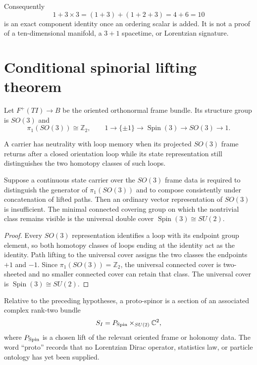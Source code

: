 \documentclass[11pt]{article}
\begin{document}
Consequently
\[
 1+3\times3=(1+3)+(1+2+3)=4+6=10
\]
is an exact component identity once an ordering scalar is added.  It is not a
proof of a ten-dimensional manifold, a $3+1$ spacetime, or Lorentzian
signature.

\section{Conditional spinorial lifting theorem}

Let $F^+(TI)\to B$ be the oriented orthonormal frame bundle.  Its structure
group is $SO(3)$ and
\[
 \pi_1(SO(3))\cong\mathbb Z_2,
 \qquad
 1\longrightarrow\{\pm1\}\longrightarrow
 \operatorname{Spin}(3)\longrightarrow SO(3)\longrightarrow1.
\]

\begin{definition}
A carrier has neutrality with loop memory when its projected $SO(3)$ frame
returns after a closed orientation loop while its state representation still
distinguishes the two homotopy classes of such loops.
\end{definition}

\begin{theorem}
Suppose a continuous state carrier over the $SO(3)$ frame data is required to
distinguish the generator of $\pi_1(SO(3))$ and to compose consistently under
concatenation of lifted paths.  Then an ordinary vector representation of
$SO(3)$ is insufficient.  The minimal connected covering group on which the
nontrivial class remains visible is the universal double cover
$\operatorname{Spin}(3)\cong SU(2)$.
\end{theorem}

\begin{proof}
Every $SO(3)$ representation identifies a loop with its endpoint group
element, so both homotopy classes of loops ending at the identity act as the
identity.  Path lifting to the universal cover assigns the two classes the
endpoints $+1$ and $-1$.  Since $\pi_1(SO(3))=\mathbb Z_2$, the universal
connected cover is two-sheeted and no smaller connected cover can retain that
class.  The universal cover is $\operatorname{Spin}(3)\cong SU(2)$.
\end{proof}

\begin{definition}
Relative to the preceding hypotheses, a proto-spinor is a section of an
associated complex rank-two bundle
\[
 S_I=P_{\rm Spin}\times_{SU(2)}\mathbb C^2,
\]
where $P_{\rm Spin}$ is a chosen lift of the relevant oriented frame or
holonomy data.  The word ``proto'' records that no Lorentzian Dirac operator,
statistics law, or particle ontology has yet been supplied.
\end{definition}
\end{document}
